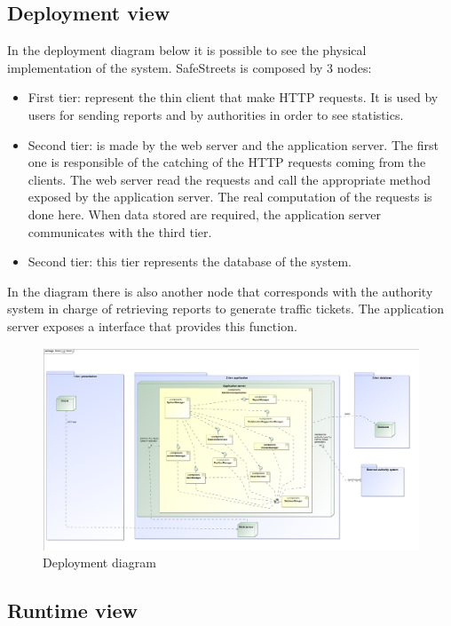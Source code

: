 \subsection{Deployment view}
In the deployment diagram below it is possible to see the physical implementation of the system.
SafeStreets is composed by 3 nodes:
\begin{itemize}
	\item 
	First tier: represent the thin client that make HTTP requests. It is used by users for sending reports and by authorities in order to see statistics.
	\item 
	Second tier: is made by the web server and the application server. The first one is responsible of the catching of the HTTP requests coming from the clients. The web server read the requests and call the appropriate method exposed by the application server. The real computation of the requests is done here.
	When data stored are required, the application server communicates with the third tier.
	\item 
	Second tier: this tier represents the database of the system. 
\end{itemize} 

In the diagram there is also another node that corresponds with the authority system in charge of retrieving reports to generate traffic tickets. The application server exposes a interface that provides this function. 

\begin{figure}[H]
	\centering
	\includegraphics[width=1.12\linewidth]{Images/Deployment.png}
	\caption{Deployment diagram}
\end{figure}

\subsection{Runtime view}
\newpage

